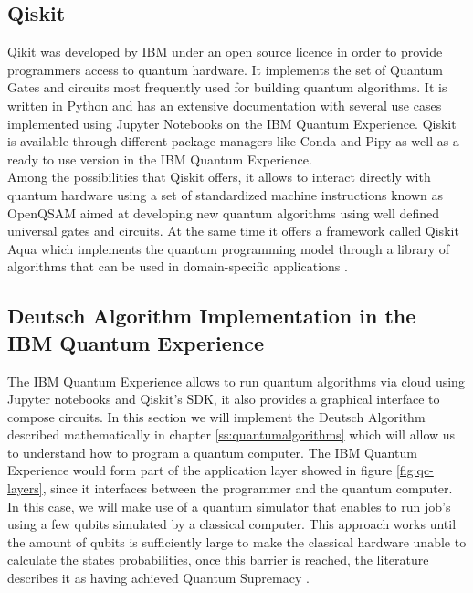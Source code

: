 \documentclass[12pt,a4paper]{scrartcl}
\begin{document}
\subsection{Qiskit}

Qikit was developed by IBM under an open source licence in order to provide programmers access to quantum hardware. It implements the set of Quantum Gates and circuits most frequently used for building quantum algorithms. It is written in Python and has an extensive documentation with several use cases implemented using Jupyter Notebooks on the IBM Quantum Experience. Qiskit is available through different package managers like Conda and Pipy as well as a ready to use version in the IBM Quantum Experience. \\

Among the possibilities that Qiskit offers, it allows to interact directly with quantum hardware using a set of standardized machine instructions known as OpenQSAM \cite{QSAM} aimed at developing new quantum algorithms using well defined universal gates and circuits. At the same time it offers a framework called Qiskit Aqua which implements the quantum programming model through a library of algorithms that can be used in domain-specific applications \cite{QiskitAqua}. 

\subsection{Deutsch Algorithm Implementation in the IBM Quantum Experience}
%
The IBM Quantum Experience \cite{ibm-q-e} allows to run quantum algorithms via cloud using Jupyter notebooks and Qiskit's SDK, it also provides a graphical interface to compose circuits. In this section we will implement the Deutsch Algorithm described mathematically in chapter \ref{ss:quantumalgorithms} which will allow us to understand how to program a quantum computer. The IBM Quantum Experience would form part of the application layer showed in figure \ref{fig:qc-layers}, since it interfaces between the programmer and the quantum computer. In this case, we will make use of a quantum simulator that enables to run job's using a few qubits simulated by a classical computer. This approach works until the amount of qubits is sufficiently large to make the classical hardware unable to calculate the states probabilities, once this barrier is reached, the literature describes it as having achieved Quantum Supremacy \cite{Arute2019}.\\
\end{document}
